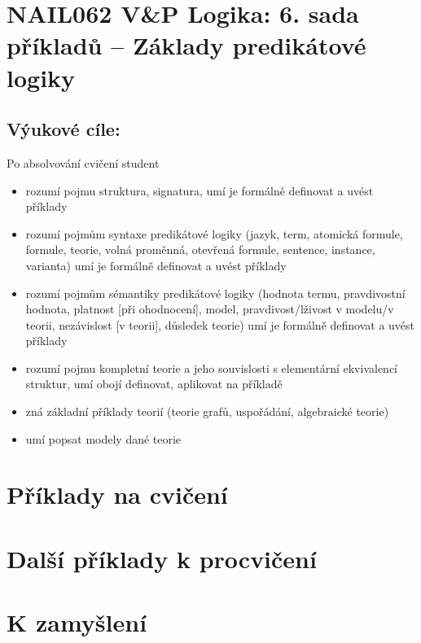 \section*{NAIL062 V\&P Logika: 6. sada příkladů -- Základy predikátové logiky}


\subsection*{Výukové cíle:} Po absolvování cvičení student

\begin{itemize}\setlength{\itemsep}{0pt}
    \item rozumí pojmu struktura, signatura, umí je formálně definovat a uvést příklady
    \item rozumí pojmům syntaxe predikátové logiky (jazyk, term, atomická formule, formule, teorie, volná proměnná, otevřená formule, sentence, instance, varianta) umí je formálně definovat a uvést příklady
    \item rozumí pojmům sémantiky predikátové logiky (hodnota termu, pravdivostní hodnota, platnost [při ohodnocení], model, pravdivost/lživost v modelu/v teorii, nezávislost [v teorii], důsledek teorie) umí je formálně definovat a uvést příklady
    \item rozumí pojmu kompletní teorie a jeho souvislosti s elementární ekvivalencí struktur, umí obojí definovat, aplikovat na příkladě
    \item zná základní příklady teorií (teorie grafů, uspořádání, algebraické teorie)
    \item umí popsat modely dané teorie    
\end{itemize}
    

\section*{Příklady na cvičení}


\begin{problem}


    \begin{solution}
                    
    \end{solution}

\end{problem}

        
        
\section*{Další příklady k procvičení}

        
\section*{K zamyšlení}


